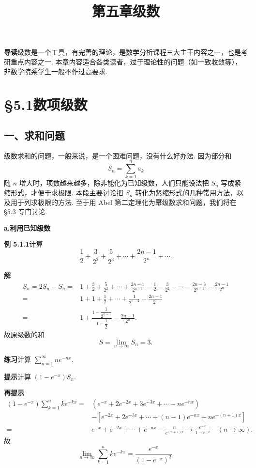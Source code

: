 \documentclass[UTF8,12pt,a4paper,fontset=fandol]{ctexart}
\title{第五章\quad 级数}
\author{}
\date{}
\begin{document}
\maketitle

\noindent\textbf{导读}\quad 级数是一个工具，有完善的理论，是数学分析课程三大主干内容之一，也是考研重点内容之一. 本章内容适合各类读者，过于理论性的问题（如一致收敛等），非数学院系学生一般不作过高要求.

\section*{§5.1\quad 数项级数}

\subsection*{一、求和问题}

级数求和的问题，一般来说，是一个困难问题，没有什么好办法. 因为部分和
\[
  S_n=\sum_{k=1}^n a_k
\]
随 $n$ 增大时，项数越来越多，除非能化为已知级数，人们只能设法把 $S_n$ 写成紧缩形式，才便于求极限. 本段主要讨论把 $S_n$ 转化为紧缩形式的几种常用方法，以及用于列求极限的方法. 至于用 Abel 第二定理化为幂级数求和问题，我们将在 §5.3 专门讨论.

\noindent\textbf{a.\quad 利用已知级数}

\noindent\textbf{例 5.1.1}\quad 计算
\[
  \frac12+\frac3{2^2}+\frac5{2^3}+\cdots+\frac{2n-1}{2^n}+\cdots.
\]

\noindent\textbf{解}\quad
\[
\begin{aligned}
S_n=2S_n-S_n
={}&1+\frac32+\frac5{2^2}+\cdots+\frac{2n-1}{2^{n-1}}
      -\frac12-\frac3{2^2}-\cdots-\frac{2n-3}{2^{n-1}}-\frac{2n-1}{2^n}\\
={}&1+1+\frac12+\cdots+\frac1{2^{n-2}}-\frac{2n-1}{2^n}\\
={}&1+\frac{1-\dfrac1{2^{n-1}}}{1-\dfrac12}-\frac{2n-1}{2^n}.
\end{aligned}
\]
故原级数的和
\[
  S=\lim_{n\to\infty}S_n=3.
\]

\noindent\textbf{练习}\quad 计算 $\displaystyle\sum_{n=1}^\infty ne^{-nx}$.

\noindent\textbf{提示}\quad 计算 $(1-e^{-x})S_n$.

\noindent\textbf{再提示}\quad
\[
\begin{aligned}
(1-e^{-x})\sum_{k=1}^n ke^{-kx}
={}&(e^{-x}+2e^{-2x}+3e^{-3x}+\cdots+ne^{-nx})\\
&-\left[e^{-2x}+2e^{-3x}+\cdots+(n-1)e^{-nx}+ne^{-(n+1)x}\right]\\
={}&e^{-x}+e^{-2x}+\cdots+e^{-nx}-\frac{n}{e^{(n+1)x}}
\to \frac{e^{-x}}{1-e^{-x}}\quad(n\to\infty).
\end{aligned}
\]
故
\[
  \lim_{n\to\infty}\sum_{k=1}^n ke^{-kx}
  =\frac{e^{-x}}{(1-e^{-x})^2}.
\]
\end{document}
